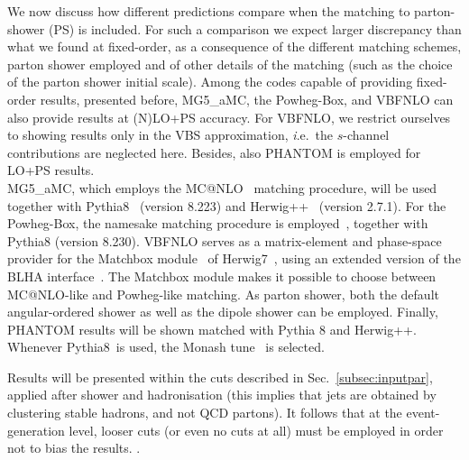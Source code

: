 We now discuss how different predictions compare when the matching to parton-shower (PS) is included. For such
a comparison we expect larger discrepancy than what we found at fixed-order, as a consequence of the different
matching schemes, parton shower employed and of other details of the matching (such as the choice of the parton shower initial scale). Among
the codes capable of providing fixed-order results, presented before, {\sc MG5\_aMC}, the {\sc Powheg-Box}, and {\sc VBFNLO}
can also provide results at (N)LO+PS accuracy. For {\sc VBFNLO}, we
restrict ourselves to showing results only in the VBS approximation,
{\emph i.e.}\ the $s$-channel contributions are neglected here. Besides,
also {\sc PHANTOM} is employed for LO+PS results.\\
{\sc MG5\_aMC}, which
employs the {\sc MC@NLO}~\cite{Frixione:2002ik} matching procedure, will be used together with {\sc Pythia8}~\cite{Sjostrand:2014zea} (version 8.223)
and {\sc Herwig++}~\cite{Bahr:2008pv, Bellm:2013hwb} (version 2.7.1). For the {\sc Powheg-Box}, the namesake
matching procedure is employed~\cite{Nason:2004rx,Frixione:2007vw}, together with {\sc Pythia8} (version 8.230). {\sc VBFNLO} serves as a matrix-element and phase-space provider
for the {\sc Matchbox} module~\cite{Platzer:2011bc} of {\sc
Herwig7}~\cite{Bellm:2015jjp,Bellm:2017bvx}, using an extended version of the BLHA
interface~\cite{Binoth:2010xt,Alioli:2013nda,Andersen:2014efa}. The {\sc Matchbox} module makes it
possible to choose between {\sc MC\-@NLO}-like and {\sc Powheg}-like
matching. As parton shower, both the default angular-ordered shower as
well as the dipole shower can be employed.
Finally, {\sc PHANTOM} results will be shown matched with {\sc Pythia 8} and {\sc Herwig++}.
Whenever {\sc Pythia8}\ is used, the Monash tune~\cite{Skands:2014pea} is selected.

Results will be presented within the cuts described in Sec.~\ref{subsec:inputpar}, applied after shower and hadronisation (this implies that jets
are obtained by clustering stable hadrons, and not QCD partons). It follows that at the event-generation level, looser cuts (or even no cuts at all)
must be employed in order not to bias the results.  .

